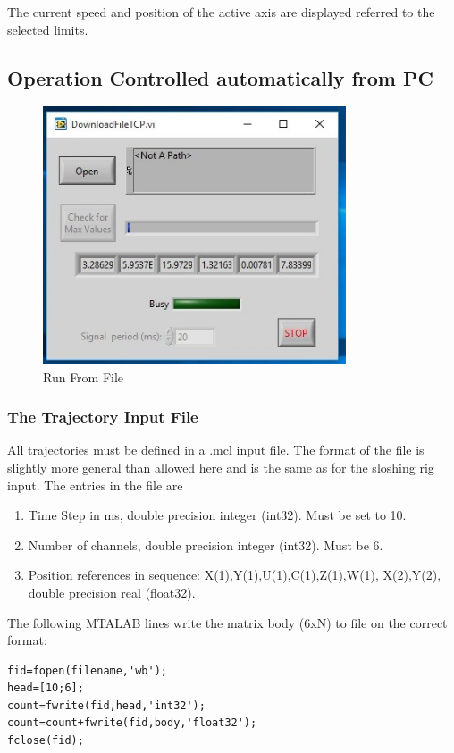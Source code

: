 \documentclass[a4paper,english]{report}
\begin{document}
The current speed and position of the active axis are displayed referred to the selected limits.

\subsection{Operation Controlled automatically from PC}

\begin{figure}[htb!]
	\centering \includegraphics[width=0.8\textwidth]{fig/towing_runfromfile}
	\caption{Run From File}
	\label{fig: Towing main-1}
\end{figure}


\subsubsection*{The Trajectory Input File}

All trajectories must be defined in a .mcl input file. The format of the file is slightly more general than allowed here and is the same as for the sloshing rig input. The entries in the file are
\begin{enumerate}
	\item Time Step in ms, double precision integer (int32). Must be set to 10.
	\item Number of channels, double precision integer (int32). Must be 6.
	\item Position references in sequence: X(1),Y(1),U(1),C(1),Z(1),W(1), X(2),Y(2), double precision real (float32).
\end{enumerate}
The following MTALAB lines write the matrix body (6xN) to file on
the correct format:
\begin{verbatim}
fid=fopen(filename,'wb');
head=[10;6];
count=fwrite(fid,head,'int32');
count=count+fwrite(fid,body,'float32');
fclose(fid); 
\end{verbatim}
\end{document}
